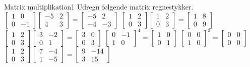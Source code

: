 \begin{opgave}{Matrix multiplikation}{1}
Udregn følgende matrix regnestykker.
\opg $\begin{bmatrix}
1&0\\0&-1
\end{bmatrix}
\begin{bmatrix}
-5&2\\4&3
\end{bmatrix} = \begin{bmatrix}
-5&2\\-4&-3
\end{bmatrix}
$
\opg $\begin{bmatrix}
1&2\\0&3
\end{bmatrix}
\begin{bmatrix}
1&2\\0&3
\end{bmatrix}=
\begin{bmatrix}
1&8\\0&9
\end{bmatrix}
$
\opg $\begin{bmatrix}
1&2\\0&3
\end{bmatrix}
\begin{bmatrix}
3&-2\\0&1
\end{bmatrix}=
\begin{bmatrix}
3&0\\0&3
\end{bmatrix}
$
\opg $\begin{bmatrix}
0&-1\\1&0
\end{bmatrix}^4=\begin{bmatrix}
1&0\\0&1
\end{bmatrix}
$
\opg $\begin{bmatrix}
0&0\\1&0
\end{bmatrix}^2
=
\begin{bmatrix}
0&0\\0&0
\end{bmatrix}
$
\opg $\begin{bmatrix}
1&2\\0&3
\end{bmatrix}
\begin{bmatrix}
7&-4\\1&-5
\end{bmatrix}
=
\begin{bmatrix}
9&-14\\
3&15
\end{bmatrix}
$
\end{opgave}

